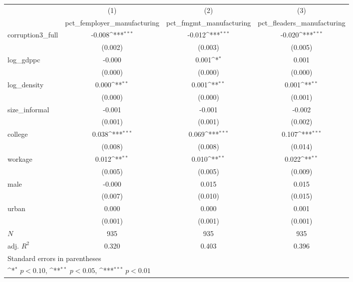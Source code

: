 {
\def\sym#1{\ifmmode^{#1}\else\(^{#1}\)\fi}
\begin{tabular}{l*{3}{c}}
\hline\hline
            &\multicolumn{1}{c}{(1)}&\multicolumn{1}{c}{(2)}&\multicolumn{1}{c}{(3)}\\
            &\multicolumn{1}{c}{pct\_femployer\_manufacturing}&\multicolumn{1}{c}{pct\_fmgmt\_manufacturing}&\multicolumn{1}{c}{pct\_fleaders\_manufacturing}\\
\hline
corruption3\_full&      -0.008\sym{***}&      -0.012\sym{***}&      -0.020\sym{***}\\
            &     (0.002)         &     (0.003)         &     (0.005)         \\
[1em]
log\_gdppc   &      -0.000         &       0.001\sym{*}  &       0.001         \\
            &     (0.000)         &     (0.000)         &     (0.000)         \\
[1em]
log\_density &       0.000\sym{**} &       0.001\sym{**} &       0.001\sym{**} \\
            &     (0.000)         &     (0.000)         &     (0.001)         \\
[1em]
size\_informal&      -0.001         &      -0.001         &      -0.002         \\
            &     (0.001)         &     (0.001)         &     (0.002)         \\
[1em]
college     &       0.038\sym{***}&       0.069\sym{***}&       0.107\sym{***}\\
            &     (0.008)         &     (0.008)         &     (0.014)         \\
[1em]
workage     &       0.012\sym{**} &       0.010\sym{**} &       0.022\sym{**} \\
            &     (0.005)         &     (0.005)         &     (0.009)         \\
[1em]
male        &      -0.000         &       0.015         &       0.015         \\
            &     (0.007)         &     (0.010)         &     (0.015)         \\
[1em]
urban       &       0.000         &       0.000         &       0.001         \\
            &     (0.001)         &     (0.001)         &     (0.001)         \\
\hline
\(N\)       &         935         &         935         &         935         \\
adj. \(R^{2}\)&       0.320         &       0.403         &       0.396         \\
\hline\hline
\multicolumn{4}{l}{\footnotesize Standard errors in parentheses}\\
\multicolumn{4}{l}{\footnotesize \sym{*} \(p<0.10\), \sym{**} \(p<0.05\), \sym{***} \(p<0.01\)}\\
\end{tabular}
}
